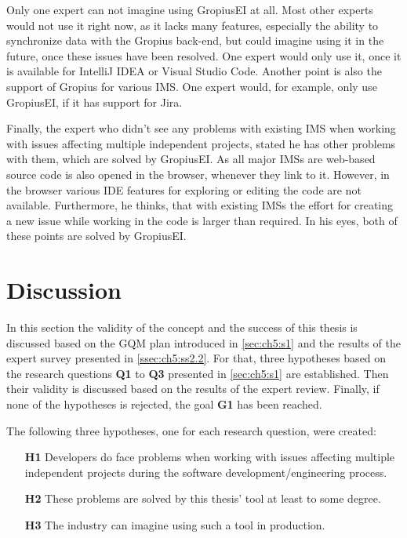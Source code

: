 Only one expert can not imagine using \gls{GropiusEI} at all.
Most other experts would not use it right now, as it lacks many features, especially the ability to synchronize data with the \gls{Gropius} back-end,
but could imagine using it in the future, once these issues have been resolved.
One expert would only use it, once it is available for IntelliJ IDEA or Visual Studio Code.
Another point is also the support of \gls{Gropius} for various \gls{IMS}.
One expert would, for example, only use \gls{GropiusEI}, if it has support for Jira.

Finally, the expert who didn't see any problems with existing \gls{IMS} when working with issues affecting multiple independent projects, stated he has other problems with them, which are solved by \gls{GropiusEI}.
As all major \glspl{IMS} are web-based source code is also opened in the browser, whenever they link to it.
However, in the browser various \gls{IDE} features for exploring or editing the code are not available.
Furthermore, he thinks, that with existing \glspl{IMS} the effort for creating a new issue while working in the code is larger than required.
In his eyes, both of these points are solved by \gls{GropiusEI}.

\section{Discussion}
\label{sec:ch5:s3}
In this section the validity of the concept and the success of this thesis is discussed based on the \gls{GQM} plan introduced in \cref{sec:ch5:s1} and the results of the expert survey presented in \cref{ssec:ch5:ss2.2}.
For that, three hypotheses based on the research questions \textbf{Q1} to \textbf{Q3} presented in \cref{sec:ch5:s1} are established. 
Then their validity is discussed based on the results of the expert review.
Finally, if none of the hypotheses is rejected, the goal \textbf{G1} has been reached.

The following three hypotheses, one for each research question, were created:
\begin{itemize}
	\item[\textbf{H1}] Developers do face problems when working with issues affecting multiple independent projects during the software development/engineering process.
	\item[\textbf{H2}] These problems are solved by this thesis' tool at least to some degree.
	\item[\textbf{H3}] The industry can imagine using such a tool in production.
\end{itemize}

